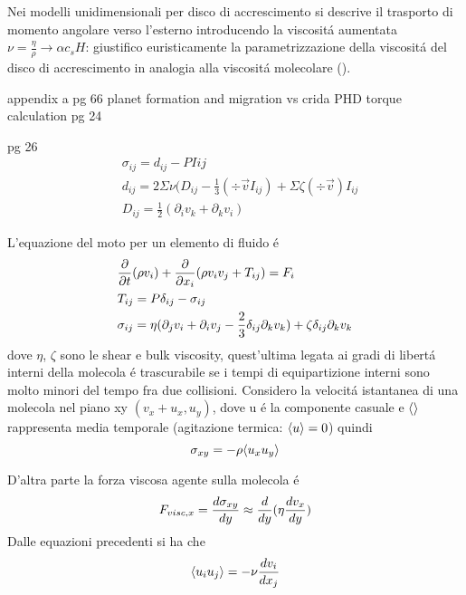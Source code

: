 
Nei modelli unidimensionali per disco di accrescimento si descrive il trasporto di momento angolare verso l'esterno introducendo la viscosit\'a aumentata $\nu=\frac{\eta}{\rho}\to\alpha c_s H$: giustifico euristicamente la parametrizzazione della viscosit\'a del disco di accrescimento in analogia alla viscosit\'a molecolare (\cite{bouvier2002theory}).

\begin{workout}
	appendix a pg 66 planet formation and migration vs crida PHD torque calculation pg 24
\end{workout}
\begin{workout}
	pg 26
	\begin{align}
		&\sigma_{ij}=d_{ij}-PI{ij}\\
		&d_{ij}=2\Sigma\nu(D_{ij}-\frac{1}{3}(\div{\vec{v}}I_{ij})+\Sigma\zeta(\div{\vec{v}})I_{ij}\\
		&D_{ij}=\frac{1}{2}(\partial_iv_k+\partial_kv_i)
	\end{align}
\end{workout}

L'equazione del moto per un elemento di fluido \'e
\begin{align}
	&\PDof{t}(\rho v_i)+\PDof{x_i}(\rho v_iv_j+T_{ij})=F_i\label{eq:fluidmotion}\\
	&T_{ij}=P\delta_{ij}-\sigma_{ij}\\
	&\sigma_{ij}=\eta(\partial_jv_i+\partial_iv_j-\frac{2}{3}\delta_{ij}\partial_kv_k)+\zeta\delta_{ij}\partial_kv_k
\end{align}
dove $\eta$, $\zeta$ sono le shear e bulk viscosity, quest'ultima legata ai gradi di libert\'a interni della molecola \'e trascurabile se i tempi di equipartizione interni sono molto minori del tempo fra due collisioni.
Considero la velocit\'a istantanea di una molecola nel piano xy $(v_x+u_x,u_y)$, dove u \'e la componente casuale e $\exv{}$ rappresenta media temporale (agitazione termica: $\exv{u}=0$) quindi
\begin{equation}
\sigma_{xy}=-\rho\exv{u_xu_y}
\end{equation}

D'altra parte la forza viscosa agente sulla molecola \'e
\begin{equation}
F_{visc,x}=\TDy{y}{\sigma_{xy}}\approx\TDof{y}(\eta\TDy{y}{v_x})
\end{equation}
Dalle equazioni precedenti si ha che
\begin{equation}
\exv{u_iu_j}=-\nu\TDy{x_j}{v_i}\label{eq:molvisccorr}
\end{equation}

